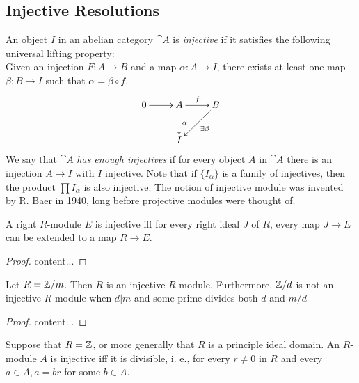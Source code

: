 \subsection{Injective Resolutions}

\begin{definition}
	An object $I$ in an abelian category $\cat{A}$ is \textit{injective} if it satisfies the following universal lifting property: \\
	Given an injection $F:A\rightarrow B$ and a map $\alpha:A\rightarrow I$, there exists at least one map $\beta:B\rightarrow I$ such that $\alpha=\beta\circ f$.
	\begin{align*}
		\xymatrix{
			0 \ar[r] &A \ar[r]^f \ar[d]^\alpha & B \ar[ld]^{\exists\beta} \\
			&I
		}
	\end{align*}
	We say that $\cat{A}$ \textit{has enough injectives} if for every object $A$ in $\cat{A}$ there is an injection $A\rightarrow I$ with $I$ injective. Note that if $\{I_\alpha\}$ is a family of injectives, then the product $\prod I_\alpha$ is also injective.
	The notion of injective module was invented by R. Baer in 1940, long before projective modules were thought of.
\end{definition}

\begin{criterion}[Baer]
	A right $R$-module $E$ is injective iff for every right ideal $J$ of $R$, every map $J\rightarrow E$ can be extended to a map $R\rightarrow E$.
\end{criterion}

\begin{proof}
	content...
\end{proof}

\begin{exercise}
	Let $R={\mathbb Z}/m$. Then $R$ is an injective $R$-module.
	Furthermore, ${\mathbb Z}/d$ is not an injective $R$-module when $d\vert m$ and some prime divides both $d$ and $m/d$
\end{exercise}

\begin{proof}
	content...
\end{proof}

\begin{corollary}
	Suppose that $R={\mathbb Z}$, or more generally that $R$ is a principle ideal domain. An $R$-module $A$ is injective iff it is divisible, i. e., for every $r\neq0$ in $R$ and every $a\in A, a=br$ for some $b\in A$.
\end{corollary}

